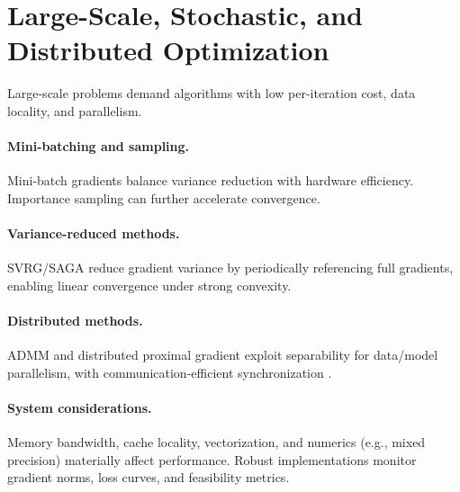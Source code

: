 \section{Large-Scale, Stochastic, and Distributed Optimization}
\label{sec:large-scale}
Large-scale problems demand algorithms with low per-iteration cost, data locality, and parallelism.

\paragraph{Mini-batching and sampling.} Mini-batch gradients balance variance reduction with hardware efficiency. Importance sampling can further accelerate convergence.

\paragraph{Variance-reduced methods.} SVRG/SAGA reduce gradient variance by periodically referencing full gradients, enabling linear convergence under strong convexity.

\paragraph{Distributed methods.} ADMM and distributed proximal gradient exploit separability for data/model parallelism, with communication-efficient synchronization \cite{boyd2011admm}.

\paragraph{System considerations.} Memory bandwidth, cache locality, vectorization, and numerics (e.g., mixed precision) materially affect performance. Robust implementations monitor gradient norms, loss curves, and feasibility metrics.